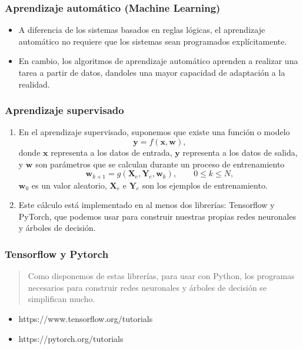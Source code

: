 \documentclass[11pt]{beamer}
\begin{document}
    \begin{frame}
    	\frametitle{Aprendizaje automático (Machine Learning)}
    	
    	\begin{itemize}
    	\item A diferencia de los sistemas basados en reglas lógicas, el aprendizaje automático no requiere que los sistemas sean programados explícitamente. 
    	
    	\item En cambio, los algoritmos de aprendizaje automático aprenden a realizar una tarea a partir de datos, dandoles una mayor capacidad de adaptación a la realidad.
    	\end{itemize}
    \end{frame}

    \begin{frame}
    	\frametitle{Aprendizaje supervisado}
    	
    	\begin{enumerate}
    		\item En el aprendizaje supervisado, suponemos que existe una función o modelo
    		\begin{equation}
    			\mathbf{y} = f(\mathbf{x}, \mathbf{w}),
    		\end{equation}
    	    donde $\mathbf{x}$ representa a los datos de entrada, $\mathbf{y}$ representa a los datos de salida, y $\mathbf{w}$ son parámetros que se calculan durante un proceso de entrenamiento
    	    \begin{equation}
    	    	\mathbf{w}_{k+1} = g(\mathbf{X}_{e}, \mathbf{Y}_{e}, \mathbf{w}_{k}), \qquad 0 \leq k \leq N,
    	    \end{equation}
            $\mathbf{w}_{0}$ es un valor aleatorio, $\mathbf{X}_{e}$ e $\mathbf{Y}_{e}$ son los ejemplos de entrenamiento.
            
            \item Este cálculo está implementado en al menos dos librerías: Tensorflow y PyTorch, que podemos usar para construir nuestras propias redes neuronales y árboles de decisión. 
    	\end{enumerate}
    \end{frame}

    \begin{frame}
    	\frametitle{Tensorflow y Pytorch}
    	
    	\begin{quote}
    	Como disponemos de estas librerías, para usar con Python, los programas necesarios para construir redes neuronales y árboles de decisión se simplifican mucho.
    	\end{quote}
    
    	\begin{itemize}
    		\item https://www.tensorflow.org/tutorials
    		\item https://pytorch.org/tutorials
    	\end{itemize}
    \end{frame}
\end{document}
